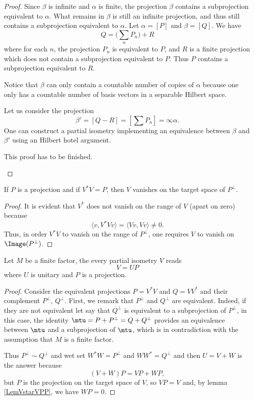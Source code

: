 \begin{proof}
Since $\beta$ is infinite and $\alpha$ is finite, the projection $\beta$ contains a subprojection equivalent to $\alpha$. What remains in $\beta$ is still an infinite projection, and thus still contains a subprojection equivalent to $\alpha$. Let $\alpha=[P]$ and $\beta=[Q]$. We have
\[ 
  Q=\big( \sum_nP_n \big)+R
\]
where for each $n$, the projection $P_n$ is equivalent to $P$, and $R$ is a finite projection which does not contain a subprojection equivalent to $P$. Thus $P$ contains a subprojection equivalent to $R$.

Notice that $\beta$ can only contain a countable number of copies of $\alpha$ because one only has a countable number of basis vectors in a separable Hilbert space.

Let us consider the projection
\begin{equation}
	\beta'=[Q-R]=[\sum P_n]=\infty\alpha.
\end{equation}
One can construct a partial isometry implementing an equivalence between $\beta$ and $\beta'$ using an Hilbert hotel argument.
\begin{probleme}
This proof has to be finished.
\end{probleme}
\end{proof}

\begin{lemma}	\label{LemVstarVPP}
If $P$ is a projection and if $V^*V=P$, then $V$ vanishes on the target space of $P^{\perp}$.
\end{lemma}

\begin{proof}
It is evident that $V^*$ does not vanish on the range of $V$ (apart on zero) because
\[ 
  \langle v, V^*Vv\rangle =\langle Vv, Vv\rangle \neq 0.
\]
Thus, in order $V^*V$ to vanish on the range of $P^{\perp}$, one requires $V$ to vanish on $\Image(P^{\perp})$.
\end{proof}

\begin{lemma}		\label{LemfinifactisemVUP}
Let $M$ be a finite factor, the every partial isometry $V$ reads
\begin{equation}
	V=UP
\end{equation}
where $U$ is unitary and $P$ is a projection.
\end{lemma}

\begin{proof}
Consider the equivalent projections $P=V^*V$ and $Q=VV^*$ and their complement $P^{\perp}$, $Q^{\perp}$. First, we remark that $P^{\perp}$ and $Q^{\perp}$ are equivalent. Indeed, if they are not equivalent let say that $Q^{\perp}$ is equivalent to a subprojection of $P^{\perp}$, in this case, the identity $\mtu=P+P^{\perp}=Q+Q^{\perp}$ provides an equivalence between $\mtu$ and a subprojection of $\mtu$, which is in contradiction with the assumption that $M$ is a finite factor.

Thus $P^{\perp}\sim Q^{\perp}$ and wet set $W^*W=P^{\perp}$ and $WW^*=Q^{\perp}$ and then $U=V+W$ is the answer because
\[ 
  (V+W)P=VP+WP,
\]
but $P$ is the projection on the target space of $V$, so $VP=V$ and, by lemma \ref{LemVstarVPP}, we have $WP=0$.
\end{proof}


